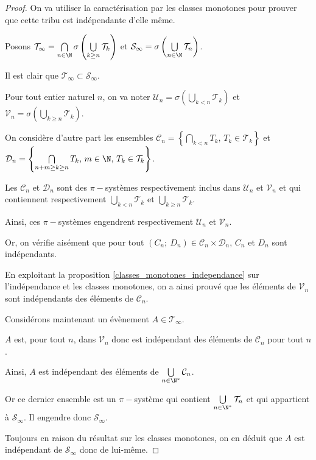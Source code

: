 \begin{proof}
On va utiliser la caractérisation par les classes monotones pour prouver que cette tribu est indépendante d'elle même.

Posons $\mathcal{T}_{\infty} = \bigcap \limits_{n \in \N} \sigma\left(\bigcup \limits_{k \geq n} \mathcal{T}_k \right)$ et $\mathcal{S}_{\infty} =  \sigma\left(\bigcup \limits_{n \in \N} \mathcal{T}_n \right)$.

Il est clair que $\mathcal{T}_{\infty} \subset \mathcal{S}_{\infty}$.

Pour tout entier naturel $n$, on va noter $\mathcal{U}_n =\sigma\left(\bigcup \limits_{k < n} \mathcal{T}_k \right)$ et $\mathcal{V}_n =\sigma\left(\bigcup \limits_{k \geq n} \mathcal{T}_k \right)$.

On considère d'autre part les ensembles $\mathcal{C}_n = \left \{\bigcap \limits_{k < n} T_k, \, T_k \in \mathcal{T}_k \right \}$ et $\mathcal{D}_n = \left \{\bigcap \limits_{n+m \geq k \geq n} T_k, \, m \in \N, \, T_k \in \mathcal{T}_k \right \}$.

Les $\mathcal{C}_n$ et $\mathcal{D}_n$ sont des $\pi-$systèmes respectivement inclus dans $\mathcal{U}_n$ et $\mathcal{V}_n$ et qui contiennent respectivement $\bigcup \limits_{k < n} \mathcal{T}_k$ et $\bigcup \limits_{k \geq n} \mathcal{T}_k$. 

Ainsi, ces $\pi-$systèmes engendrent respectivement $\mathcal{U}_n$ et $\mathcal{V}_n$.

Or, on vérifie aisément que pour tout $(C_n;~D_n) \in \mathcal{C}_n \times \mathcal{D}_n$, $C_n$ et $D_n$ sont indépendants.

En exploitant la proposition \ref{classes_monotones_independance} sur l'indépendance et les classes monotones, on a ainsi prouvé que les éléments de $\mathcal{V}_n$ sont indépendants des éléments de $\mathcal{C}_n$.

Considérons maintenant un évènement $A \in \mathcal{T}_{\infty}$. 

$A$ est, pour tout $n$, dans $\mathcal{V}_n$ donc est indépendant des éléments de $\mathcal{C}_n$ pour tout $n$.

Ainsi, $A$ est indépendant des éléments de  $\bigcup \limits_{n \in \N^{*}} \mathcal{C}_n$.

Or ce dernier ensemble est un $\pi-$système qui contient $\bigcup \limits_{n \in \N^{*}} \mathcal{T}_n$ et qui appartient à $\mathcal{S}_{\infty}$. Il engendre donc $\mathcal{S}_{\infty}$. 

Toujours en raison du résultat sur les classes monotones, on en déduit que $A$ est indépendant de $\mathcal{S}_{\infty}$ donc de lui-même.
\end{proof}


